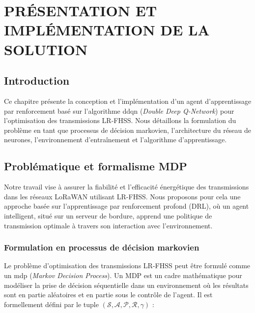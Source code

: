 \chapter{PRÉSENTATION ET IMPLÉMENTATION DE LA SOLUTION}

\section{Introduction}
\label{sec:intro-ddqn}

Ce chapitre présente la conception et l'implémentation d'un agent d'apprentissage par renforcement basé sur l'algorithme \gls{ddqn} (\textit{Double Deep Q-Network}) pour l'optimisation des transmissions LR-FHSS. Nous détaillons la formulation du problème en tant que processus de décision markovien, l'architecture du réseau de neurones, l'environnement d'entraînement et l'algorithme d'apprentissage.

\section{Problématique et formalisme MDP}
\label{sec:problematique-mdp}
Notre travail vise à assurer la fiabilité et l'efficacité énergétique des transmissions dans les réseaux LoRaWAN utilisant LR-FHSS. Nous proposons pour cela une approche basée sur l'apprentissage par renforcement profond (DRL), où un agent intelligent, situé sur un serveur de bordure, apprend une politique de transmission optimale à travers son interaction avec l'environnement.

\subsection{Formulation en processus de décision markovien}
\label{subsec:formulation-mdp}

Le problème d'optimisation des transmissions LR-FHSS peut être formulé comme un \gls{mdp} (\textit{Markov Decision Process}). Un MDP est un cadre mathématique pour modéliser la prise de décision séquentielle dans un environnement où les résultats sont en partie aléatoires et en partie sous le contrôle de l'agent. Il est formellement défini par le tuple $(\mathcal{S}, \mathcal{A}, \mathcal{P}, \mathcal{R}, \gamma)$ \cite{puterman1994mdp,sutton2018reinforcement} :

